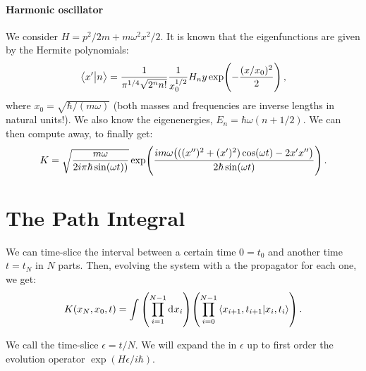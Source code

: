 \documentclass[main.tex]{subfiles}
\begin{document}
\paragraph{Harmonic oscillator}

We consider \(H = p^2/2m + m \omega^2 x^2 / 2\). It is known that the eigenfunctions are given by the Hermite polynomials: 
%
\begin{equation}
  \braket{x'}{n} = \frac{1}{\pi^{1/4} \sqrt{2^{n} n!}} \frac{1}{x_0^{1/2}} H_n y \exp(-\frac{(x/x_0)^2}{2}) 
\,,
\end{equation}
%
where \(x_0 = \sqrt{\hbar / (m \omega )} \) (both masses and frequencies are inverse lengths in natural units!). We also know the eigenenergies, \(E_n = \hbar \omega (n+1/2)\). We can then compute away, to finally get: 
%
\begin{equation}
  K = \sqrt{\frac{m \omega }{2 i \pi \hbar \sin(\omega t))}}
  \exp(\frac{im \omega \qty(((x'')^2+(x')^2)\cos(\omega t)-2x'x'' )}{2 \hbar \sin(\omega t) })  
\,.
\end{equation}
%

\section{The Path Integral}

We can time-slice the interval between a certain time \(0 = t_0\) and another time \(t = t_N\) in \(N\) parts. Then, evolving the system with a the propagator for each one, we get: 
%
\begin{equation}
  K(x_N, x_0, t) = 
  \int \qty(\prod _{i=1}^{N-1} \dd[]{x_i}) \qty(\prod_{i=0}^{N-1}\braket{x_{i+1}, t_{i+1}}{x_i, t_i})  
\,.
\end{equation}

We call the time-slice \(\epsilon = t/N\). We will expand the in \(\epsilon \) up to first order the evolution operator \(\exp(H \epsilon /i \hbar) \).
\end{document}
